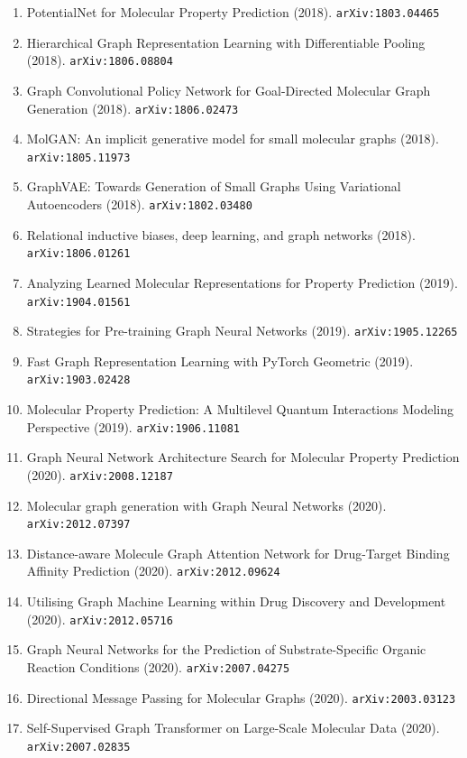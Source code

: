\documentclass[11pt]{article}
\begin{document}
\begin{enumerate}
  Understanding (2018). \texttt{arXiv:1810.04805}
  \item PotentialNet for Molecular Property Prediction (2018). \texttt{arXiv:1803.04465}
  \item Hierarchical Graph Representation Learning with Differentiable Pooling (2018). \texttt{arXiv:1806.08804}
  \item Graph Convolutional Policy Network for Goal-Directed Molecular Graph
  Generation (2018). \texttt{arXiv:1806.02473}
  \item MolGAN: An implicit generative model for small molecular graphs (2018). \texttt{arXiv:1805.11973}
  \item GraphVAE: Towards Generation of Small Graphs Using Variational
  Autoencoders (2018). \texttt{arXiv:1802.03480}
  \item Relational inductive biases, deep learning, and graph networks (2018). \texttt{arXiv:1806.01261}
  \item Analyzing Learned Molecular Representations for Property Prediction (2019). \texttt{arXiv:1904.01561}
  \item Strategies for Pre-training Graph Neural Networks (2019). \texttt{arXiv:1905.12265}
  \item Fast Graph Representation Learning with PyTorch Geometric (2019). \texttt{arXiv:1903.02428}
  \item Molecular Property Prediction: A Multilevel Quantum Interactions
  Modeling Perspective (2019). \texttt{arXiv:1906.11081}
  \item Graph Neural Network Architecture Search for Molecular Property
  Prediction (2020). \texttt{arXiv:2008.12187}
  \item Molecular graph generation with Graph Neural Networks (2020). \texttt{arXiv:2012.07397}
  \item Distance-aware Molecule Graph Attention Network for Drug-Target Binding
  Affinity Prediction (2020). \texttt{arXiv:2012.09624}
  \item Utilising Graph Machine Learning within Drug Discovery and Development (2020). \texttt{arXiv:2012.05716}
  \item Graph Neural Networks for the Prediction of Substrate-Specific Organic
  Reaction Conditions (2020). \texttt{arXiv:2007.04275}
  \item Directional Message Passing for Molecular Graphs (2020). \texttt{arXiv:2003.03123}
  \item Self-Supervised Graph Transformer on Large-Scale Molecular Data (2020). \texttt{arXiv:2007.02835}

\end{enumerate}
\end{document}
